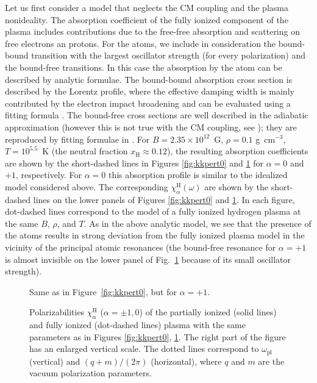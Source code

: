 \documentclass{emulateapj}
\newcommand{\gcc}{\mbox{g cm$^{-3}$}}
\newcommand{\chiH}{\chi^\mathrm{H}}
\newcommand{\ompl}{\omega_\mathrm{pl}} %
\newcommand{\xH}{x_\mathrm{H}}
\begin{document}
Let us first consider a model that neglects the CM coupling and the
plasma nonideality. The absorption coefficient of the fully ionized
component of the plasma includes contributions due to the free-free
absorption and scattering on free electrons an protons. For the atoms,
we include in consideration the bound-bound transition with the
largest oscillator strength (for every polarization) and the bound-free
transitions. In this case the absorption by the atom can be described
by analytic formulae. The bound-bound absorption cross section is
described by the Lorentz profile, where the effective damping width is
mainly contributed by the electron impact broadening \citep{PP95} and
can be evaluated using a fitting formula \citep{P98}. The bound-free
cross sections are well described in the adiabatic approximation 
(however this is not true with the CM coupling, see \citealt{PP97});
they are reproduced by fitting formulae in \citet{PP93}. For
$B=2.35\times10^{12}$~G, $\rho=0.1$ \gcc, $T=10^{5.5}$~K (the neutral
fraction $\xH\approx0.12$), the resulting absorption coefficients are
shown by the short-dashed lines in Figures \ref{fig:kkpert0} and
\ref{fig:kkpert1} for $\alpha=0$ and $+1$, respectively. For $\alpha=0$
this absorption profile is similar to the idealized model considered
above. The corresponding $\chiH_\alpha(\omega)$ are shown by the
short-dashed lines on the lower panels of Figures \ref{fig:kkpert0}
and \ref{fig:kkpert1}. In each figure, dot-dashed lines correspond to
the model of a fully ionized hydrogen plasma at the same $B$, $\rho$,
and $T$. As in the above analytic model, we see that the presence of
the atoms results in strong deviation from the fully ionized plasma
model in the vicinity of the principal atomic resonances (the
bound-free resonance for $\alpha=+1$ is almost invisible on the lower
panel of Fig.~\ref{fig:kkpert1} because of its small oscillator
strength).

\begin{figure}
\caption{Same as in Figure~\protect\ref{fig:kkpert0},
but for $\alpha=+1$.
\label{fig:kkpert1}}
\end{figure}

\begin{figure}
\caption{Polarizabilities $\chiH_\alpha$ ($\alpha=\pm1,0$)
of the partially ionized (solid lines) and fully ionized (dot-dashed lines)
plasma with the same parameters as in Figures \protect\ref{fig:kkpert0},
\protect\ref{fig:kkpert1}. The right part of the figure has an enlarged
vertical scale. The dotted lines
correspond to $\ompl$ (vertical) and $(q+m)/(2\pi)$
(horizontal), where $q$ and $m$ are
the vacuum polarization parameters.
\label{fig:kk12a3}}
\end{figure}
\end{document}
